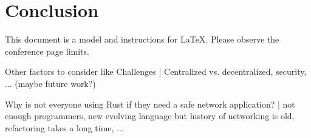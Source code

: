 
\section{Conclusion}
This document is a model and instructions for LaTeX.
Please observe the conference page limits.

Other factors to consider like Challenges | Centralized vs. decentralized, security, ... (maybe future work?)

Why is not everyone using Rust if they need a safe network application? | not enough programmers, new evolving language
but history of networking is old, refactoring takes a long time, ...

